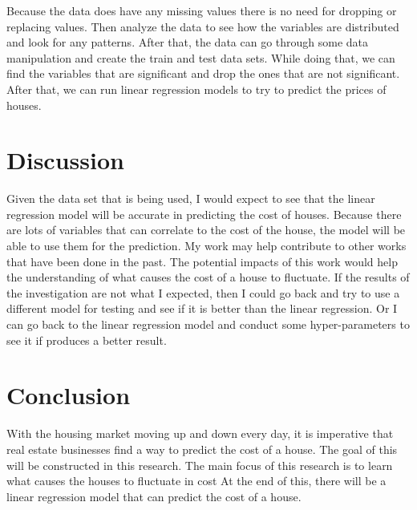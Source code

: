 \documentclass{article}
\begin{document}
Because the data does have any missing values there is no need for dropping or replacing values. Then analyze the data to see how the variables are distributed and look for any patterns. After that, the data can go through some data manipulation and create the train and test data sets. While doing that, we can find the variables that are significant and drop the ones that are not significant. After that, we can run linear regression models to try to predict the prices of houses. 

\section{Discussion}

Given the data set that is being used, I would expect to see that the linear regression model will be accurate in predicting the cost of houses. Because there are lots of variables that can correlate to the cost of the house, the model will be able to use them for the prediction. My work may help contribute to other works that have been done in the past. The potential impacts of this work would help the understanding of what causes the cost of a house to fluctuate. If the results of the investigation are not what I expected, then I could go back and try to use a different model for testing and see if it is better than the linear regression. Or I can go back to the linear regression model and conduct some hyper-parameters to see it if produces a better result. 

\section{Conclusion}

With the housing market moving up and down every day, it is imperative that real estate businesses find a way to predict the cost of a house. The goal of this will be constructed in this research. The main focus of this research is to learn what causes the houses to fluctuate in cost At the end of this, there will be a linear regression model that can predict the cost of a house. 

% 
% 
\end{document}
